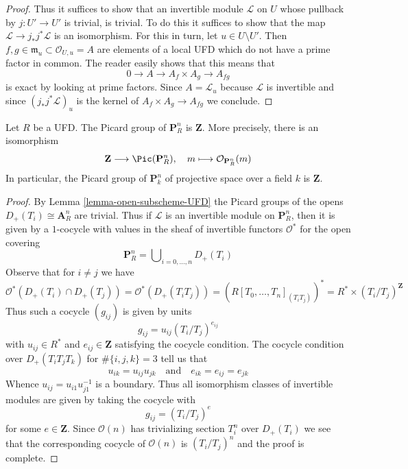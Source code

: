 \begin{proof}
\medskip\noindent
Thus it suffices to show that an invertible module $\mathcal{L}$
on $U$ whose pullback by $j : U' \to U'$ is trivial, is trivial.
To do this it suffices to show that the map
$\mathcal{L} \to j_*j^*\mathcal{L}$ is an isomorphism.
For this in turn, let $u \in U \setminus U'$. Then
$f, g \in \mathfrak m_u \subset \mathcal{O}_{U, u} = A$ are elements
of a local UFD which do not have a prime factor in common. The reader
easily shows that this means that
$$
0 \to A \to A_f \times A_g \to A_{fg}
$$
is exact by looking at prime factors. Since $A = \mathcal{L}_u$
because $\mathcal{L}$ is invertible and since $(j_*j^*\mathcal{L})_u$
is the kernel of $A_f \times A_g \to A_{fg}$ we conclude.
\end{proof}

\begin{lemma}
\label{lemma-Pic-projective-space-UFD}
Let $R$ be a UFD. The Picard group of $\mathbf{P}^n_R$
is $\mathbf{Z}$. More precisely, there is an isomorphism
$$
\mathbf{Z} \longrightarrow \Pic(\mathbf{P}^n_R),\quad
m \longmapsto \mathcal{O}_{\mathbf{P}^n_R}(m)
$$
In particular, the Picard group of $\mathbf{P}^n_k$ of projective
space over a field $k$ is $\mathbf{Z}$.
\end{lemma}

\begin{proof}
By Lemma \ref{lemma-open-subscheme-UFD} the Picard groups of the opens
$D_+(T_i) \cong \mathbf{A}^n_R$ are trivial.
Thus if $\mathcal{L}$ is an invertible module on
$\mathbf{P}^n_R$, then it is given by a $1$-cocycle with values in
the sheaf of invertible functors $\mathcal{O}^*$ for the open covering
$$
\mathbf{P}^n_R = \bigcup\nolimits_{i = 0, \ldots, n} D_+(T_i)
$$
Observe that for $i \not = j$ we have
$$
\mathcal{O}^*(D_+(T_i) \cap D_+(T_j)) =
\mathcal{O}^*(D_+(T_iT_j)) = \left(R[T_0, \ldots, T_n]_{(T_iT_j)}\right)^* =
R^* \times (T_i/T_j)^\mathbf{Z}
$$
Thus such a cocycle $(g_{ij})$ is given by units
$$
g_{ij} = u_{ij} (T_i/T_j)^{e_{ij}}
$$
with $u_{ij} \in R^*$ and $e_{ij} \in \mathbf{Z}$
satisfying the cocycle condition. The cocycle condition
over $D_+(T_iT_jT_k)$ for $\#\{i, j, k\} = 3$ tell us that
$$
u_{ik} = u_{ij} u_{jk} \quad\text{and}\quad
e_{ik} = e_{ij} = e_{jk}
$$
Whence $u_{ij} = u_{i1} u_{j1}^{-1}$ is a boundary.
Thus all isomorphism classes of invertible modules
are given by taking the cocycle with
$$
g_{ij} = (T_i/T_j)^e
$$
for some $e \in \mathbf{Z}$. Since $\mathcal{O}(n)$ has trivializing
section $T_i^n$ over $D_+(T_i)$ we see that the corresponding
cocycle of $\mathcal{O}(n)$ is $(T_i/T_j)^n$ and the proof is complete.
\end{proof}






